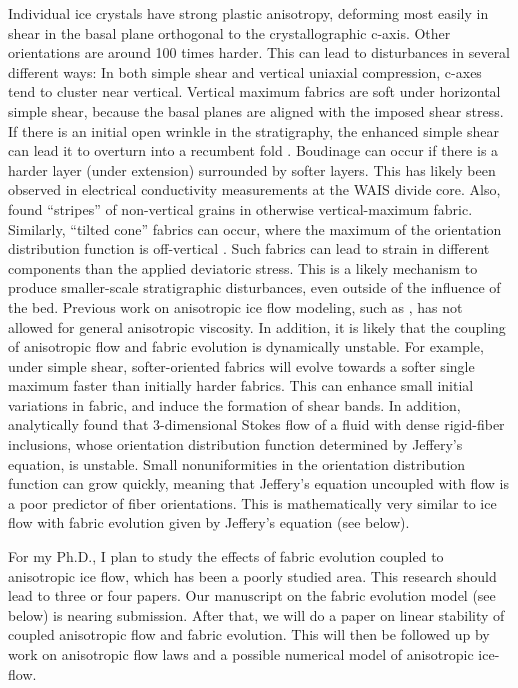 \documentclass{article}
\begin{document}
Individual ice crystals have strong plastic anisotropy, deforming most easily in shear in the basal plane orthogonal to the crystallographic c-axis. Other orientations are around 100 times harder. This can lead to disturbances in several different ways: In both simple shear and vertical uniaxial compression, c-axes tend to cluster near vertical. Vertical maximum fabrics are soft under horizontal simple shear, because the basal planes are aligned with the imposed shear stress. If there is an initial open wrinkle in the stratigraphy, the enhanced simple shear can lead it to overturn into a recumbent fold \citep{throstur2002}. Boudinage can occur if there is a harder layer (under extension) surrounded by softer layers. This has likely been observed in electrical conductivity measurements at the WAIS divide core. Also, \citet{alley97} found ``stripes'' of non-vertical grains in otherwise vertical-maximum fabric. Similarly, ``tilted cone'' fabrics can occur, where the maximum of the orientation distribution function is off-vertical \citep{throstur2002}. Such fabrics can lead to strain in different components than the applied deviatoric stress. This is a likely mechanism to produce smaller-scale stratigraphic disturbances, even outside of the influence of the bed. Previous work on anisotropic ice flow modeling, such as \citet{gillet2005}, has not allowed for general anisotropic viscosity. In addition, it is likely that the coupling of anisotropic flow and fabric evolution is dynamically unstable. For example, under simple shear, softer-oriented fabrics will evolve towards a softer single maximum faster than initially harder fabrics. This can enhance small initial variations in fabric, and induce the formation of shear bands. In addition, \citet{montgomery-smith2011} analytically found that 3-dimensional Stokes flow of a fluid with dense rigid-fiber inclusions, whose orientation distribution function determined by Jeffery's equation, is unstable. Small nonuniformities in the orientation distribution function can grow quickly, meaning that Jeffery's equation uncoupled with flow is a poor predictor of fiber orientations. This is mathematically very similar to ice flow with fabric evolution given by Jeffery's equation (see below).

For my Ph.D., I plan to study the effects of fabric evolution coupled to anisotropic ice flow, which has been a poorly studied area. This research should lead to three or four papers. Our manuscript on the fabric evolution model (see below) is nearing submission.  After that, we will do a paper on linear stability of coupled anisotropic flow and fabric evolution. This will then be followed up by work on anisotropic flow laws and a possible numerical model of anisotropic ice-flow.
\end{document}
